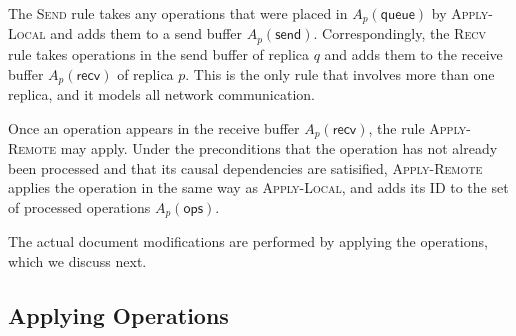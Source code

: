 \documentclass[10pt,journal,compsoc]{IEEEtran}
\begin{document}
The \textsc{Send} rule takes any operations that were placed in $A_p(\mathsf{queue})$ by \textsc{Apply-Local} and adds them to a send buffer $A_p(\mathsf{send})$. Correspondingly, the \textsc{Recv} rule takes operations in the send buffer of replica $q$ and adds them to the receive buffer $A_p(\mathsf{recv})$ of replica $p$. This is the only rule that involves more than one replica, and it models all network communication.

Once an operation appears in the receive buffer $A_p(\mathsf{recv})$, the rule \textsc{Apply-Remote} may apply. Under the preconditions that the operation has not already been processed and that its causal dependencies are satisified, \textsc{Apply-Remote} applies the operation in the same way as \textsc{Apply-Local}, and adds its ID to the set of processed operations $A_p(\mathsf{ops})$.

The actual document modifications are performed by applying the operations, which we discuss next.

\subsection{Applying Operations}
\end{document}
